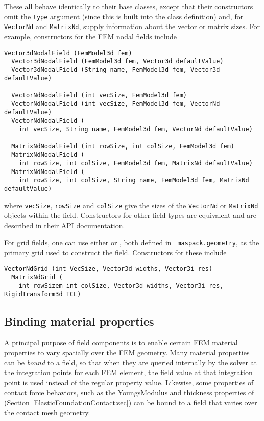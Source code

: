 %
These all behave identically to their base classes,
except that their constructors omit the {\tt type} argument (since
this is built into the class definition) and, for {\tt VectorNd} and
{\tt MatrixNd}, supply information about the vector or matrix sizes.
For example, constructors for the FEM nodal fields include
%
\begin{lstlisting}[]
  Vector3dNodalField (FemModel3d fem)
  Vector3dNodalField (FemModel3d fem, Vector3d defaultValue)
  Vector3dNodalField (String name, FemModel3d fem, Vector3d defaultValue)

  VectorNdNodalField (int vecSize, FemModel3d fem)
  VectorNdNodalField (int vecSize, FemModel3d fem, VectorNd defaultValue)
  VectorNdNodalField (
    int vecSize, String name, FemModel3d fem, VectorNd defaultValue)

  MatrixNdNodalField (int rowSize, int colSize, FemModel3d fem)
  MatrixNdNodalField (
    int rowSize, int colSize, FemModel3d fem, MatrixNd defaultValue)
  MatrixNdNodalField (
    int rowSize, int colSize, String name, FemModel3d fem, MatrixNd defaultValue)
\end{lstlisting}
%
where {\tt vecSize}, {\tt rowSize} and {\tt colSize} give the sizes of
the {\tt VectorNd} or {\tt MatrixNd} objects within the
field. Constructors for other field types are equivalent and are described
in their API documentation.

For grid fields, one can use either
 or
, both defined in {\tt
maspack.geometry}, as the primary grid used to construct the
field. Constructors for these include
%
\begin{lstlisting}[]
  VectorNdGrid (int VecSize, Vector3d widths, Vector3i res)
  MatrixNdGrid (
    int rowSizem int colSize, Vector3d widths, Vector3i res, RigidTransform3d TCL)
\end{lstlisting}
%

\subsection{Binding material properties}
\label{sec:fieldBinding}

A principal purpose of field components is to enable certain FEM
material properties to vary spatially over the FEM geometry.  Many
material properties can be {\it bound} to a field, so that when they
are queried internally by the solver at the integration points for
each FEM element, the field value at that integration point is used
instead of the regular property value. Likewise, some
properties of contact force behaviors, such as
the {\sf YoungsModulus} and {\sf thickness} properties of
(Section \ref{ElasticFoundationContact:sec}) can be bound to a field
that varies over the contact mesh geometry.

